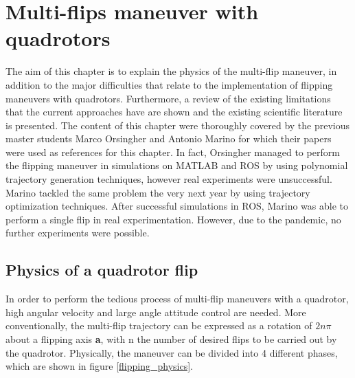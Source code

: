 \documentclass{thesisreport}
\begin{document}
 
 \chapter{Multi-flips maneuver with quadrotors}


The aim of this chapter is to explain the physics of the multi-flip maneuver, in addition to the major difficulties that relate to the implementation of flipping maneuvers with quadrotors. Furthermore, a review of the existing limitations that the current approaches have are shown and the existing scientific literature is presented. The content of this chapter were thoroughly covered by the previous master students Marco Orsingher and Antonio Marino for which their papers were used as references for this chapter. In fact, Orsingher \cite{Orsingher2019} managed to perform the flipping maneuver in simulations on MATLAB and ROS by using polynomial trajectory generation techniques, however real experiments were unsuccessful. Marino \cite{Marino2020} tackled the same problem the very next year by using trajectory optimization techniques. After successful simulations in ROS, Marino was able to perform a single flip in real experimentation. However, due to the pandemic, no further experiments were possible.


\section{Physics of a quadrotor flip}\label{multiflip_physics}


In order to perform the tedious process of multi-flip maneuvers with a quadrotor, high angular velocity and large angle attitude control are needed. More conventionally, the multi-flip trajectory can be expressed as a rotation of $2n \pi$ about a flipping axis \textbf{a}, with n the number of desired flips to be carried out by the quadrotor. Physically, the maneuver can be divided into 4 different phases, which are shown in figure \ref{flipping_physics}.
\end{document}

